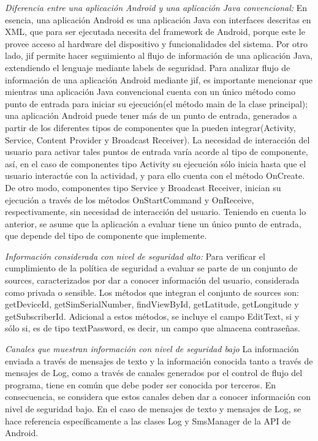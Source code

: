 \textit{Diferencia entre una aplicación Android y una aplicación Java
convencional:}\newline 
En esencia, una aplicación Android es una aplicación Java con interfaces
descritas en XML, que para ser ejecutada necesita del framework de Android,
porque este le provee acceso al hardware del dispositivo y funcionalidades del
sistema.\newline 
Por otro lado, jif permite hacer seguimiento al flujo de información de una
aplicación Java, extendiendo el lenguaje mediante labels de seguridad.\newline
Para analizar flujo de información de una aplicación Android mediante
jif, es importante mencionar que mientras una aplicación Java convencional
cuenta con un único método como punto de entrada para iniciar su ejecución(el
método main de la clase principal); una aplicación Android puede tener más de un
punto de entrada, generados a partir de los diferentes tipos de componentes que
la pueden integrar(Activity, Service, Content Provider y Broadcast
Receiver). La necesidad de interacción del usuario para activar tales puntos de
entrada varía acorde al tipo de componente, así, en el caso de componentes tipo
Activity su ejecución sólo inicia hasta que el usuario interactúe con la
actividad, y para ello cuenta con el método OnCreate. De otro modo, componentes
tipo Service y Broadcast Receiver, inician su ejecución a través de los métodos
OnStartCommand y OnReceive, respectivamente, sin necesidad de interacción del
usuario.\newline 
{ \color{black} {Teniendo en cuenta lo anterior, se asume que la aplicación a
evaluar tiene un único punto de entrada, que depende del tipo de componente que
implemente.} }

\textit{Información considerada con nivel de seguridad alto:}\newline
Para verificar el cumplimiento de la política de seguridad a evaluar se parte de
un conjunto de sources, caracterizados por dar a conocer información del
usuario, considerada como privada o sensible. Los métodos que integran el
conjunto de sources son: getDeviceId, getSimSerialNumber, findViewById,
getLatitude, getLongitude y getSubscriberId. Adicional a estos métodos, se
incluye el campo EditText, si y sólo si, es de tipo textPassword, es decir, un
campo que almacena contraseñas.

\textit{Canales que muestran información con nivel de seguridad bajo}\newline
La información enviada a través de mensajes de texto y la información conocida
tanto a través de mensajes de Log, como a través de canales generados por el
control de flujo del programa, tiene en común que debe poder ser conocida por
terceros. En consecuencia, se considera que estos canales deben dar a conocer
información con nivel de seguridad bajo.\newline
En el caso de mensajes de texto y mensajes de Log, se hace referencia
específicamente a las clases Log y SmsManager de la API de Android.

